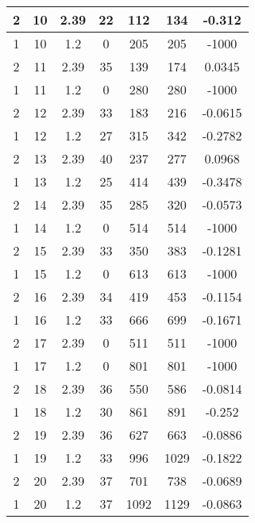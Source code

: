 \documentclass[letterpaper, 12pt]{article}
\begin{document}
\begin{longtable}{|c|c|c|c|c|c|c|}
\hline
2 & 10 & 2.39 & 22 & 112 & 134 & -0.312 \\
\hline
1 & 10 & 1.2 & 0 & 205 & 205 & -1000 \\
\hline
2 & 11 & 2.39 & 35 & 139 & 174 & 0.0345 \\
\hline
1 & 11 & 1.2 & 0 & 280 & 280 & -1000 \\
\hline
2 & 12 & 2.39 & 33 & 183 & 216 & -0.0615 \\
\hline
1 & 12 & 1.2 & 27 & 315 & 342 & -0.2782 \\
\hline
2 & 13 & 2.39 & 40 & 237 & 277 & 0.0968 \\
\hline
1 & 13 & 1.2 & 25 & 414 & 439 & -0.3478 \\
\hline
2 & 14 & 2.39 & 35 & 285 & 320 & -0.0573 \\
\hline
1 & 14 & 1.2 & 0 & 514 & 514 & -1000 \\
\hline
2 & 15 & 2.39 & 33 & 350 & 383 & -0.1281 \\
\hline
1 & 15 & 1.2 & 0 & 613 & 613 & -1000 \\
\hline
2 & 16 & 2.39 & 34 & 419 & 453 & -0.1154 \\
\hline
1 & 16 & 1.2 & 33 & 666 & 699 & -0.1671 \\
\hline
2 & 17 & 2.39 & 0 & 511 & 511 & -1000 \\
\hline
1 & 17 & 1.2 & 0 & 801 & 801 & -1000 \\
\hline
2 & 18 & 2.39 & 36 & 550 & 586 & -0.0814 \\
\hline
1 & 18 & 1.2 & 30 & 861 & 891 & -0.252 \\
\hline
2 & 19 & 2.39 & 36 & 627 & 663 & -0.0886 \\
\hline
1 & 19 & 1.2 & 33 & 996 & 1029 & -0.1822 \\
\hline
2 & 20 & 2.39 & 37 & 701 & 738 & -0.0689 \\
\hline
1 & 20 & 1.2 & 37 & 1092 & 1129 & -0.0863 \\
\hline
\end{longtable}
\end{document}
